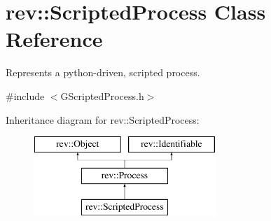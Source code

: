 \hypertarget{classrev_1_1_scripted_process}{}\section{rev\+::Scripted\+Process Class Reference}
\label{classrev_1_1_scripted_process}


Represents a python-\/driven, scripted process.  




{\ttfamily \#include $<$G\+Scripted\+Process.\+h$>$}

Inheritance diagram for rev\+::Scripted\+Process\+:\begin{figure}[H]
\begin{center}
\leavevmode
\includegraphics[height=3.000000cm]{classrev_1_1_scripted_process}
\end{center}
\end{figure}
